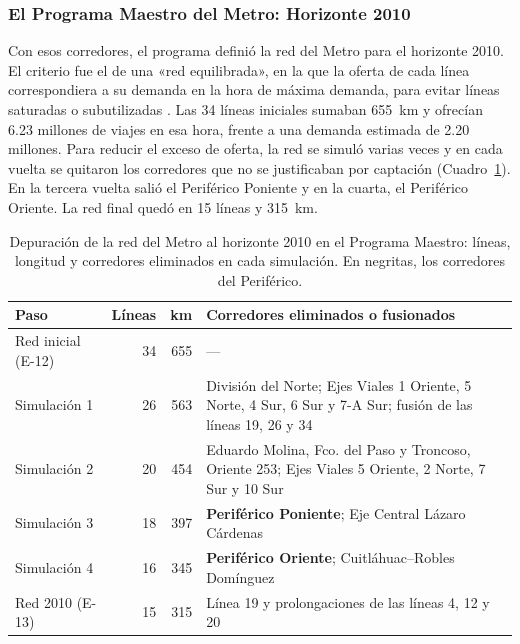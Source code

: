 \subsubsection{El Programa Maestro del Metro: Horizonte 2010}
\label{subsubsec:anillo-pm-2010}

Con esos corredores, el programa definió la red del Metro para el horizonte
2010. El criterio fue el de una «red equilibrada», en la que la oferta de cada
línea correspondiera a su demanda en la hora de máxima demanda, para evitar
líneas saturadas o subutilizadas \citep[p.~63]{ddf1985programa}. Las 34 líneas
iniciales sumaban 655~km y ofrecían 6.23 millones de viajes en esa hora, frente
a una demanda estimada de 2.20 millones. Para reducir el exceso de oferta, la
red se simuló varias veces y en cada vuelta se quitaron los corredores que no se
justificaban por captación (Cuadro~\ref{tab:anillo-pm-depuracion}). En la
tercera vuelta salió el Periférico Poniente y en la cuarta, el Periférico
Oriente. La red final quedó en 15 líneas y 315~km.

\begin{table}[H]
    \centering
    \caption[Depuración de la red del Metro al horizonte 2010]{%
    Depuración de la red del Metro al horizonte 2010 en el Programa Maestro:
    líneas, longitud y corredores eliminados en cada simulación. En negritas,
    los corredores del Periférico.}
    \label{tab:anillo-pm-depuracion}
    \small
    \setlength{\tabcolsep}{4pt}
    \begin{tabularx}{\textwidth}{|l|r|r|X|}
        \hline
        \textbf{Paso} & \textbf{Líneas} & \textbf{km} &
            \textbf{Corredores eliminados o fusionados} \\
        \hline
        Red inicial (E-12) & 34 & 655 & --- \\
        \hline
        Simulación 1 & 26 & 563 & División del Norte; Ejes Viales 1 Oriente,
            5 Norte, 4 Sur, 6 Sur y 7-A Sur; fusión de las líneas 19, 26 y 34 \\
        \hline
        Simulación 2 & 20 & 454 & Eduardo Molina, Fco. del Paso y Troncoso,
            Oriente 253; Ejes Viales 5 Oriente, 2 Norte, 7 Sur y 10 Sur \\
        \hline
        Simulación 3 & 18 & 397 & \textbf{Periférico Poniente}; Eje Central
            Lázaro Cárdenas \\
        \hline
        Simulación 4 & 16 & 345 & \textbf{Periférico Oriente};
            Cuitláhuac--Robles Domínguez \\
        \hline
        Red 2010 (E-13) & 15 & 315 & Línea 19 y prolongaciones de las líneas
            4, 12 y 20 \\
        \hline
    \end{tabularx}
\end{table}

